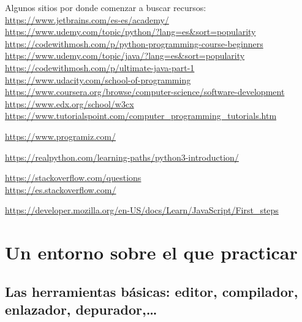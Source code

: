 \documentclass[spanish,12pt,a4paper,final,oneside]{book}
\begin{document}
Algunos sitios por donde comenzar a buscar recursos:
\\ \url{https://www.jetbrains.com/es-es/academy/}
\\ \url{https://www.udemy.com/topic/python/?lang=es&sort=popularity}
\\ \url{https://codewithmosh.com/p/python-programming-course-beginners}
\\ \url{https://www.udemy.com/topic/java/?lang=es&sort=popularity}
\\ \url{https://codewithmosh.com/p/ultimate-java-part-1}
\\ \url{https://www.udacity.com/school-of-programming}
\\ \url{https://www.coursera.org/browse/computer-science/software-development}
\\ \url{https://www.edx.org/school/w3cx}
\url{https://www.tutorialspoint.com/computer_programming_tutorials.htm}

\url{https://www.programiz.com/}

\url{https://realpython.com/learning-paths/python3-introduction/}

\url{https://stackoverflow.com/questions}
\\ \url{https://es.stackoverflow.com/}

\url{https://developer.mozilla.org/en-US/docs/Learn/JavaScript/First_steps}




\chapter{Un entorno sobre el que practicar}



\section{Las herramientas básicas: editor, compilador,  enlazador, depurador,\ldots}
\end{document}
